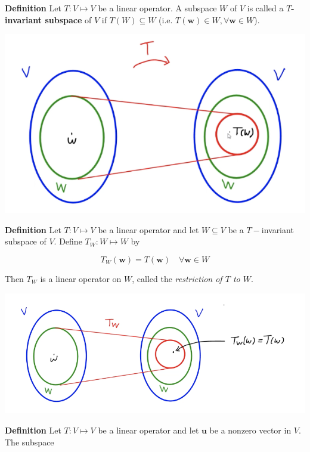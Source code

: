 \documentclass[10pt,landscape]{article}
\begin{document}
\begin{multicols}{4}
\textbf{Definition} Let $T : V \mapsto V$ be a linear operator. A subspace $W$ of $V$ is called a $T$\textbf{-invariant subspace} of $V$ if $T(W) \subseteq W$ (i.e. $T(\mathbf{w}) \in W, \forall \mathbf{w} \in W$).

\includegraphics[width=\columnwidth]{images/t-invariant.png}

\textbf{Definition} Let $T: V \mapsto V$ be a linear operator and let $W \subseteq V$ be a $T-$invariant subspace of $V$. Define $T_W : W \mapsto W$ by 

$$
T_W(\mathbf{w}) = T(\mathbf{w}) \quad \forall \mathbf{w} \in W
$$

Then $T_W$ is a linear operator on $W$, called the \textit{restriction of $T$ to $W$}.

\includegraphics[width=\columnwidth]{images/restriction-t-w.png}


\textbf{Definition} Let $T: V \mapsto V$ be a linear operator and let $\mathbf{u}$ be a nonzero vector in $V$. The subspace


\end{multicols}
\end{document}
